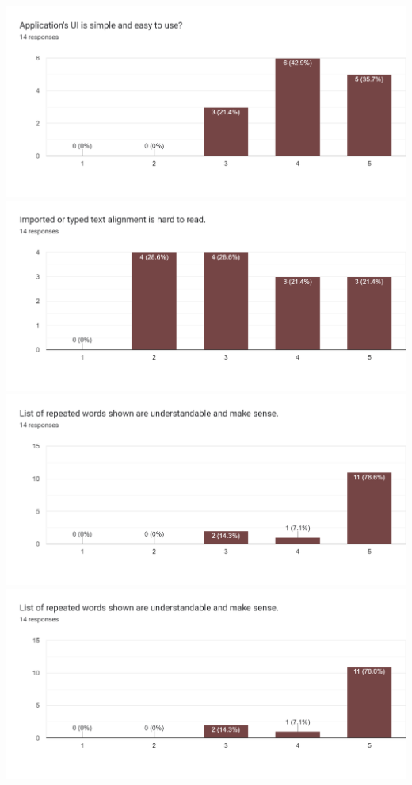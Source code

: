 \documentclass[12pt,oneside,openright,a4paper]{cpe-english-project}
\begin{document}
\includegraphics[width=15cm]{./img/chp4/q-use1.png}
\includegraphics[width=15cm]{./img/chp4/q-use2.png}
\includegraphics[width=15cm]{./img/chp4/q-use3.png}
\includegraphics[width=15cm]{./img/chp4/q-use3.png}
\end{document}
